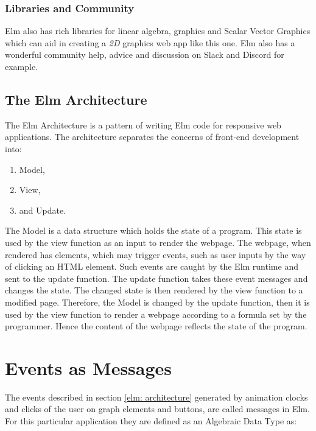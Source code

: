 \subsubsection{Libraries and Community}
Elm also has rich libraries for linear algebra, graphics and Scalar Vector
Graphics which can aid in creating a \emph{2D} graphics web app like this one.
Elm also has a wonderful community help, advice and discussion on Slack and
Discord for example.

\subsection{The Elm Architecture}
\label{elm: architecture}
The Elm Architecture is a pattern of writing Elm code for responsive web
applications.  The architecture separates the concerns of front-end development
into:

\begin{enumerate}
\item Model,
\item View,
\item and Update.
\end{enumerate}

The Model is a data structure which holds the state of a program.
\cite{Fairbank19} This state is used by the view function as an input to
render the webpage.  The webpage, when rendered has elements, which may trigger
events, such as user inputs by the way of clicking an HTML element. Such events
are caught by the Elm runtime and sent to the update function.  The update
function takes these event messages and changes the state. The changed state is
then rendered by the view function to a modified page.  Therefore, the Model is
changed by the update function, then it is used by the view function to
render a webpage according to a formula set by the programmer. Hence the content
of the webpage reflects the state of the program.


\section{Events as Messages}
\label{impl: messages}
The events described in section \autoref{elm: architecture} generated by
animation clocks and clicks of the user on graph elements and buttons, are
called messages in Elm. For this particular
application they are defined as an Algebraic Data Type as:

